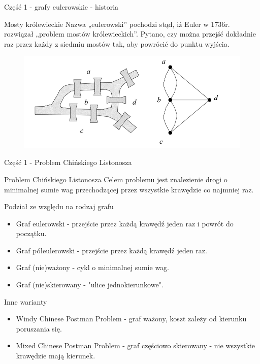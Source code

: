 \documentclass[polish,envcountsect,10pt]{beamer}
\begin{document}
\begin{frame}{Część 1 - grafy eulerowskie - historia}
    \begin{block}{Mosty królewieckie}
        Nazwa „eulerowski” pochodzi stąd, iż Euler w 1736r. rozwiązał „problem
        mostów królewieckich”. Pytano, czy można przejść dokładnie raz przez
        każdy z siedmiu mostów tak, aby powrócić do punktu wyjścia.
    \end{block}
    \begin{figure}
        \centering
        \includegraphics[width=0.7\linewidth]{./zal_a.png}
    \end{figure}
\end{frame}

\begin{frame}{Część 1 - Problem Chińskiego Listonosza}
    \begin{block}{Problem Chińskiego Listonosza}
        Celem problemu jest znalezienie drogi o minimalnej sumie wag przechodzącej przez wszystkie krawędzie co najmniej raz.
    \end{block}
    \begin{block}{Podział ze względu na rodzaj grafu}
        \begin{itemize}
            \item Graf eulerowski - przejście przez każdą krawędź jeden raz i powrót do początku.
            \item Graf półeulerowski - przejście przez każdą krawędź jeden raz.
            \item Graf (nie)ważony - cykl o minimalnej sumie wag.
            \item Graf (nie)skierowany - "ulice jednokierunkowe".
        \end{itemize}
    \end{block}
    \begin{block}{Inne warianty}
        \begin{itemize}
            \item Windy Chinese Postman Problem - graf ważony, koszt zależy od kierunku poruszania się.
            \item Mixed Chinese Postman Problem - graf częściowo skierowany - nie wszystkie krawędzie mają kierunek.
        \end{itemize}
    \end{block}
\end{frame}
\end{document}
